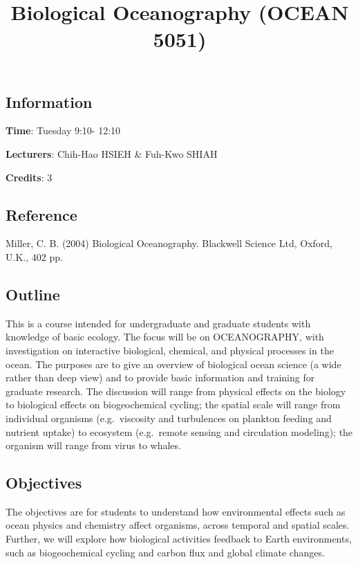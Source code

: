 \documentclass[
]{article}
\title{Biological Oceanography (OCEAN 5051)}
\author{}
\date{\vspace{-2.5em}}
\begin{document}
\maketitle

\hypertarget{information}{%
\subsection{Information}\label{information}}

\textbf{Time}: Tuesday 9:10- 12:10

\textbf{Lecturers}: Chih-Hao HSIEH \& Fuh-Kwo SHIAH

\textbf{Credits}: 3

\hypertarget{reference}{%
\subsection{Reference}\label{reference}}

Miller, C. B. (2004) Biological Oceanography. Blackwell Science Ltd,
Oxford, U.K., 402 pp.

\hypertarget{outline}{%
\subsection{Outline}\label{outline}}

This is a course intended for undergraduate and graduate students with
knowledge of basic ecology. The focus will be on OCEANOGRAPHY, with
investigation on interactive biological, chemical, and physical
processes in the ocean. The purposes are to give an overview of
biological ocean science (a wide rather than deep view) and to provide
basic information and training for graduate research. The discussion
will range from physical effects on the biology to biological effects on
biogeochemical cycling; the spatial scale will range from individual
organisms (e.g.~viscosity and turbulences on plankton feeding and
nutrient uptake) to ecosystem (e.g.~remote sensing and circulation
modeling); the organism will range from virus to whales.

\hypertarget{objectives}{%
\subsection{Objectives}\label{objectives}}

The objectives are for students to understand how environmental effects
such as ocean physics and chemistry affect organisms, across temporal
and spatial scales. Further, we will explore how biological activities
feedback to Earth environments, such as biogeochemical cycling and
carbon flux and global climate changes.
\end{document}
